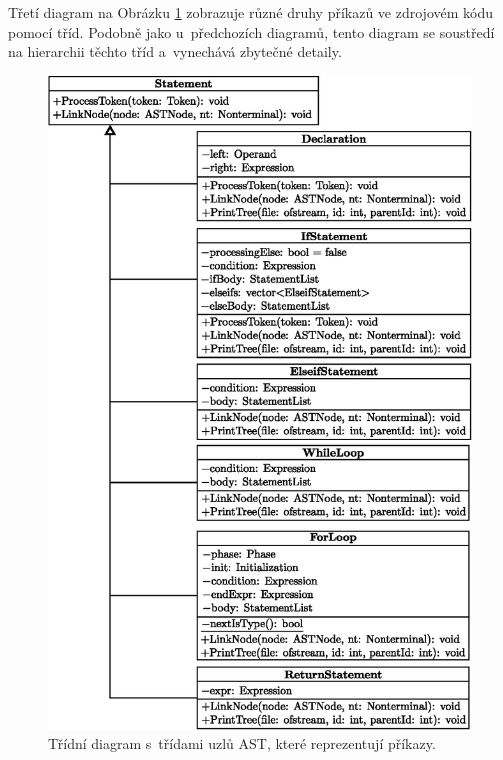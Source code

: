 Třetí diagram na Obrázku \ref{fig_hierarchie_statement} zobrazuje různé druhy příkazů ve zdrojovém kódu pomocí tříd. Podobně jako u~předchozích diagramů, tento diagram se soustředí na hierarchii těchto tříd a~vynechává zbytečné detaily.
\begin{figure}[h!]
		\centering
		\includegraphics[height=0.88\textheight]{obrazky-figures/statement_hierarchy.eps}
		\caption{Třídní diagram s~třídami uzlů AST, které reprezentují příkazy.}
		\label{fig_hierarchie_statement}
\end{figure}



%

